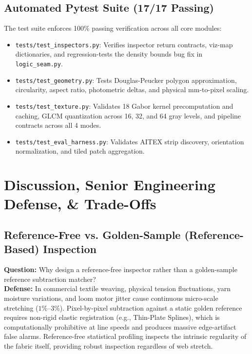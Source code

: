 \documentclass[10pt,a4paper]{article}
\begin{document}
\subsection{Automated Pytest Suite (17/17 Passing)}
The test suite enforces 100\% passing verification across all core modules:
\begin{itemize}[leftmargin=1.5em,itemsep=2pt]
    \item \texttt{tests/test\_inspectors.py}: Verifies inspector return contracts, viz-map dictionaries, and regression-tests the density bounds bug fix in \texttt{logic\_seam.py}.
    \item \texttt{tests/test\_geometry.py}: Tests Douglas-Peucker polygon approximation, circularity, aspect ratio, photometric deltas, and physical mm-to-pixel scaling.
    \item \texttt{tests/test\_texture.py}: Validates 18 Gabor kernel precomputation and caching, GLCM quantization across 16, 32, and 64 gray levels, and pipeline contracts across all 4 modes.
    \item \texttt{tests/test\_eval\_harness.py}: Validates AITEX strip discovery, orientation normalization, and tiled patch aggregation.
\end{itemize}

\section{Discussion, Senior Engineering Defense, \& Trade-Offs}

\subsection{Reference-Free vs. Golden-Sample (Reference-Based) Inspection}
\textbf{Question:} Why design a reference-free inspector rather than a golden-sample reference subtraction matcher?\\
\textbf{Defense:} In commercial textile weaving, physical tension fluctuations, yarn moisture variations, and loom motor jitter cause continuous micro-scale stretching ($1\%$--$3\%$). Pixel-by-pixel subtraction against a static golden reference requires non-rigid elastic registration (e.g., Thin-Plate Splines), which is computationally prohibitive at line speeds and produces massive edge-artifact false alarms. Reference-free statistical profiling inspects the intrinsic regularity of the fabric itself, providing robust inspection regardless of web stretch.
\end{document}
